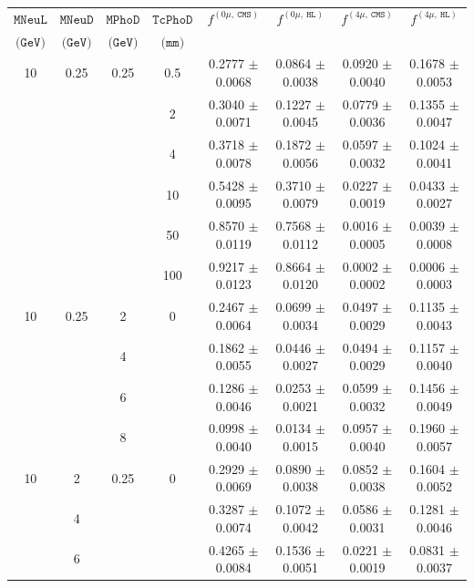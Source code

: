 \begin{table}
\begin{scriptsize}
\begin{tabular}{|cccccccc|}
\hline
$\texttt{MNeuL}$ & $\texttt{MNeuD}$ & $\texttt{MPhoD}$ & $\texttt{TcPhoD}$ & $f^{(0\mu,~\texttt{CMS})}$ & $f^{(0\mu,~\texttt{HL})}$ & $f^{(4\mu,~\texttt{CMS})}$ & $f^{(4\mu,~\texttt{HL})}$ \\
$\texttt{(GeV)}$ & $\texttt{(GeV)}$ & $\texttt{(GeV)}$ & $\texttt{(mm)}$ & & & & \\
\hline
10 & 0.25 & 0.25 & 0.5 & 0.2777 $\pm$ 0.0068 & 0.0864 $\pm$ 0.0038 & 0.0920 $\pm$ 0.0040 & 0.1678 $\pm$ 0.0053\\
& & & 2 & 0.3040 $\pm$ 0.0071 & 0.1227 $\pm$ 0.0045 & 0.0779 $\pm$ 0.0036 & 0.1355 $\pm$ 0.0047 \\
& & & 4 & 0.3718 $\pm$ 0.0078 & 0.1872 $\pm$ 0.0056 & 0.0597 $\pm$ 0.0032 & 0.1024 $\pm$ 0.0041\\
& & & 10 & 0.5428 $\pm$ 0.0095 & 0.3710 $\pm$ 0.0079 & 0.0227 $\pm$ 0.0019 & 0.0433 $\pm$ 0.0027\\
& & & 50 & 0.8570 $\pm$ 0.0119 & 0.7568 $\pm$ 0.0112 & 0.0016 $\pm$ 0.0005 & 0.0039 $\pm$ 0.0008\\
& & & 100 & 0.9217 $\pm$ 0.0123 & 0.8664 $\pm$ 0.0120 & 0.0002 $\pm$ 0.0002 & 0.0006 $\pm$ 0.0003\\
\hline
10 & 0.25 & 2 & 0 & 0.2467 $\pm$ 0.0064 & 0.0699 $\pm$ 0.0034 & 0.0497 $\pm$ 0.0029 & 0.1135 $\pm$ 0.0043 \\
& & 4 & & 0.1862 $\pm$ 0.0055 & 0.0446 $\pm$ 0.0027 & 0.0494 $\pm$ 0.0029 & 0.1157 $\pm$ 0.0040 \\
& & 6 & & 0.1286 $\pm$ 0.0046 & 0.0253 $\pm$ 0.0021 & 0.0599 $\pm$ 0.0032 & 0.1456 $\pm$ 0.0049\\
& & 8 & & 0.0998 $\pm$ 0.0040 & 0.0134 $\pm$ 0.0015 & 0.0957 $\pm$ 0.0040 & 0.1960 $\pm$ 0.0057\\
\hline
10 & 2 & 0.25 & 0 & 0.2929 $\pm$ 0.0069 & 0.0890 $\pm$ 0.0038 & 0.0852 $\pm$ 0.0038 & 0.1604 $\pm$ 0.0052\\
& 4 & & & 0.3287 $\pm$ 0.0074 & 0.1072 $\pm$ 0.0042 & 0.0586 $\pm$ 0.0031 & 0.1281 $\pm$ 0.0046 \\
& 6 & & & 0.4265 $\pm$ 0.0084 & 0.1536 $\pm$ 0.0051 & 0.0221 $\pm$ 0.0019 & 0.0831 $\pm$ 0.0037\\

\end{tabular}
\end{scriptsize}
\end{table}
